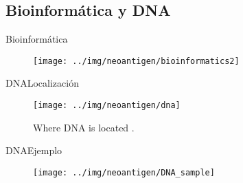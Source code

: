 \documentclass[10pt]{beamer}
\newcommand{\1}{
	\setbeamertemplate{background}{
		\texttt{[image: ../img/1]}
		\tikz[overlay] \fill[fill opacity=0.75,fill=white] (0,0) rectangle (-\paperwidth,\paperheight);
	}
}
\begin{document}
\subsection{Bioinformática y DNA}

\begin{frame}{Bioinformática}{}		
	\begin{figure}
		\texttt{[image: ../img/neoantigen/bioinformatics2]}
		
	\end{figure}		
\end{frame}

\begin{frame}{DNA}{Localización}
	\begin{figure}[]
		\centering
		\texttt{[image: ../img/neoantigen/dna]}
		\label{img:mot2}
		\caption{Where DNA is located \cite{NCIdictionary2022}.}
	\end{figure}
\end{frame}

\begin{frame}{DNA}{Ejemplo}
	\begin{figure}[]
		\centering
		\texttt{[image: ../img/neoantigen/DNA\_sample]}		
	\end{figure}
\end{frame}
\end{document}

